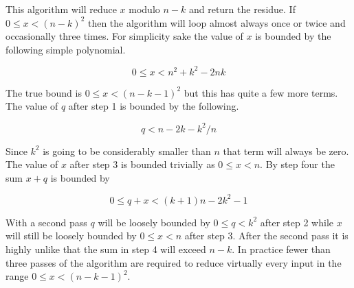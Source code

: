 \documentclass[b5paper]{book}
\begin{document}
This algorithm will reduce $x$ modulo $n - k$ and return the residue.  If $0 \le x < (n - k)^2$ then the algorithm will loop almost always
once or twice and occasionally three times.  For simplicity sake the value of $x$ is bounded by the following simple polynomial.

\begin{equation} 
0 \le x < n^2 + k^2 - 2nk
\end{equation}

The true bound is  $0 \le x < (n - k - 1)^2$ but this has quite a few more terms.  The value of $q$ after step 1 is bounded by the following.

\begin{equation}
q < n - 2k - k^2/n
\end{equation}

Since $k^2$ is going to be considerably smaller than $n$ that term will always be zero.  The value of $x$ after step 3 is bounded trivially as
$0 \le x < n$.  By step four the sum $x + q$ is bounded by 

\begin{equation}
0 \le q + x < (k + 1)n - 2k^2 - 1
\end{equation}

With a second pass $q$ will be loosely bounded by $0 \le q < k^2$ after step 2 while $x$ will still be loosely bounded by $0 \le x < n$ after step 3.  After the second pass it is highly unlike that the
sum in step 4 will exceed $n - k$.  In practice fewer than three passes of the algorithm are required to reduce virtually every input in the 
range $0 \le x < (n - k - 1)^2$.  
\end{document}
